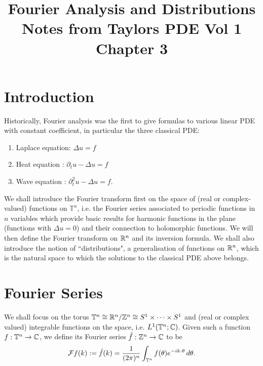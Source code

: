 \documentclass{article}
\title{Fourier Analysis and Distributions\\
\large Notes from Taylors PDE Vol 1 Chapter 3}
\date{}
\begin{document}
\maketitle

\section{Introduction}
Historically, Fourier analysis was the first to give formulas to various linear PDE with constant coefficient, in particular the three classical PDE: 
\begin{enumerate}
\item Laplace equation: $\Delta u = f$
\item Heat equation : $\partial_t u - \Delta u = f$
\item Wave equation : $\partial^2_t u - \Delta u = f$. 
\end{enumerate}
We shall introduce the Fourier transform first on the space of (real or complex-valued) functions on $\mathbb{T}^n$, i.e. the Fourier series associated to periodic functions in $n$ variables which provide basic results for harmonic functions in the plane (functions with $\Delta u = 0$) and their connection to holomorphic functions. We will then define the Fourier transform on ${\mathbb R}^n$ and its inversion formula. We shall also introduce the notion of ``distributions", a generalisation of functions on ${\mathbb R}^n$, which is the natural space to which the solutions to the classical PDE above belongs. 

\section{Fourier Series}
We shall focus on the torus $\mathbb{T}^n \cong {\ensuremath {\mathbb R}}^n / {\mathbb Z}^n \cong S^1 \times \dots \times S^1$ and (real or complex valued) integrable functions on the space, i.e. $L^1({\mathbb T}^n; {\mathbb C})$. Given such a function $f: {\mathbb T}^n \to {\ensuremath {\mathbb C}}$, we define its Fourier series $\hat{f}: {\mathbb Z}^n \to {\ensuremath {\mathbb C}}$ to be 
\begin{align} \label{eq: fourier series}
{\ensuremath {\cal F}} f(k) := \hat{f}(k) = \frac{1}{(2 \pi)^n} \int_{{\mathbb T}^n} f(\theta) e^{-ik \cdot \theta}\, d\theta. 
\end{align}
\end{document}
